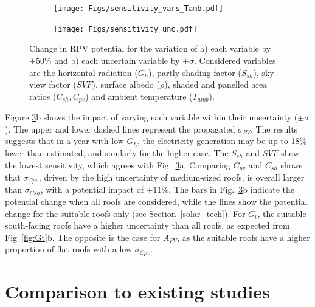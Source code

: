 \begin{figure}[b]
\centering
\begin{subfigure}{.49\textwidth}
  \centering
  \texttt{[image: Figs/sensitivity\_vars\_Tamb.pdf]}
  \subcaption{}
  \label{figa:sens_vars}
\end{subfigure}
\begin{subfigure}{.49\textwidth}
  \centering
  \texttt{[image: Figs/sensitivity\_unc.pdf]}  
  \subcaption{}
  \label{figb:sens_vars}
\end{subfigure}
\caption{Change in RPV potential for the variation of a) each variable by $\pm 50\%$ and b) each uncertain variable by $\pm \sigma$. Considered variables are the horizontal radiation ($G_h$), partly shading factor ($S_{sh}$), sky view factor ($\mathit{SVF}$), surface albedo ($\rho$), shaded and panelled area ratios ($C_{sh}, C_{\mathit{pv}}$) and ambient temperature ($T_{amb}$).}
\label{fig:sens_vars}
\end{figure}

Figure \ref{fig:sens_vars}b shows the impact of varying each variable within their uncertainty ($\pm \sigma$). 
The upper and lower dashed lines represent the propagated $\sigma_{PV}$. 
The results suggests that in a year with low $G_h$, the electricity generation may be up to 18\% lower than estimated, and similarly for the higher case. 
The $S_{sh}$ and $\mathit{SVF}$ show the lowest sensitivity, which agrees with Fig.~\ref{fig:sens_vars}a.
Comparing $C_{\mathit{pv}}$ and $C_{sh}$ shows that $\sigma_{\mathit{Cpv}}$, driven by the high uncertainty of medium-sized roofs, is overall larger than $\sigma_{\mathit{Csh}}$, with a potential impact of $\pm 11 \%$. 
%
The bars in Fig.~\ref{fig:sens_vars}b indicate the potential change when all roofs are considered, while the lines show the potential change for the suitable roofs only (see Section~\ref{solar_tech}). 
For $G_t$, the suitable south-facing roofs have a higher uncertainty than all roofs, as expected from Fig~\ref{fig:Gt}b. 
The opposite is the case for $A_{PV}$, as the suitable roofs have a higher proportion of flat roofs with a low $\sigma_{\mathit{Cpv}}$.




\section{Comparison to existing studies}
\label{solar_comparison}

